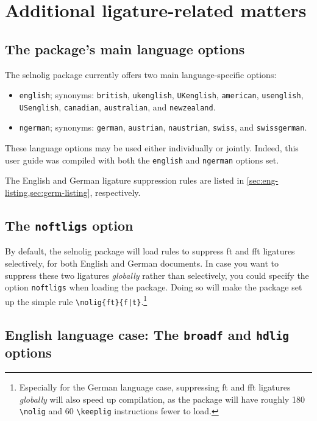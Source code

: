 \documentclass[11pt]{article}
\newcommand{\pkg}[1]{\textsf{#1}}
\newcommand{\opt}[1]{\texttt{#1}}
\newcommand{\cmmd}[1]{\texttt{\textbackslash #1}}
\begin{document}
\section{Additional ligature-related matters}
\label{sec:options}


\subsection{The package's main language options}

The \pkg{selnolig} package currently offers two main language-specific options: 
\begin{itemize}
\item \opt{english}; synonyms: \opt{british}, \opt{ukenglish}, \opt{UKenglish}, \opt{amer\-ican}, \opt{usenglish}, \opt{USenglish}, \opt{cana\-dian}, \opt{australian}, and \opt{new\-zealand}.
\item \opt{ngerman}; synonyms: \opt{german}, \opt{austrian}, \opt{naustrian}, \opt{swiss}, and \opt{swiss\-german}.
\end{itemize}
These language options may be used either individually or jointly. Indeed, this user guide was compiled with both the \opt{english} and \opt{ngerman} options set.

The English and German ligature suppression rules are listed in \cref{sec:eng-listing,sec:germ-listing}, respectively.


\subsection{The \opt{noftligs} option}

By default, the \pkg{selnolig} package will load rules to suppress ft and fft ligatures selectively, for both English and German documents. In case you want to suppress these two ligatures \emph{globally} rather than selectively, you could specify the option \opt{noftligs} when loading the package. Doing so will make the package set up the simple rule \Verb+\nolig{ft}{f|t}+.\footnote{Especially for the German language case, suppressing ft and fft ligatures \emph{globally} will also speed up compilation, as the package will have roughly 180 \cmmd{nolig} and 60 \cmmd{keeplig} instructions fewer to load.}



\subsection[English language case: The broadf and hdlig options]{English language case: The \opt{broadf} and \opt{hdlig} options} \label{sec:eng-opt}
\end{document}
